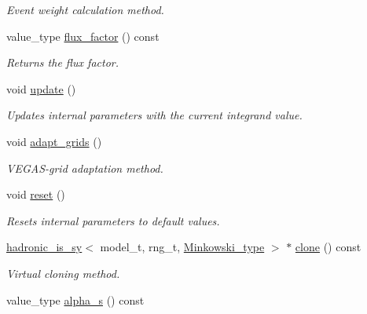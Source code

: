 \begin{DoxyCompactItemize}
\begin{DoxyCompactList}\small\item\em Event weight calculation method. \end{DoxyCompactList}\item 
\hypertarget{a00259_adc018439680f98e95fd4330c8d384fc6}{}value\+\_\+type \hyperlink{a00259_adc018439680f98e95fd4330c8d384fc6}{flux\+\_\+factor} () const \label{a00259_adc018439680f98e95fd4330c8d384fc6}

\begin{DoxyCompactList}\small\item\em Returns the flux factor. \end{DoxyCompactList}\item 
\hypertarget{a00259_a6436d3581b268b19b9c4ae576fb2b8f6}{}void \hyperlink{a00259_a6436d3581b268b19b9c4ae576fb2b8f6}{update} ()\label{a00259_a6436d3581b268b19b9c4ae576fb2b8f6}

\begin{DoxyCompactList}\small\item\em Updates internal parameters with the current integrand value. \end{DoxyCompactList}\item 
\hypertarget{a00259_a758d1e8e7b40f03cc075521722616539}{}void \hyperlink{a00259_a758d1e8e7b40f03cc075521722616539}{adapt\+\_\+grids} ()\label{a00259_a758d1e8e7b40f03cc075521722616539}

\begin{DoxyCompactList}\small\item\em V\+E\+G\+A\+S-\/grid adaptation method. \end{DoxyCompactList}\item 
\hypertarget{a00259_a413a2200c7a02cdf6468b705b624a2e1}{}void \hyperlink{a00259_a413a2200c7a02cdf6468b705b624a2e1}{reset} ()\label{a00259_a413a2200c7a02cdf6468b705b624a2e1}

\begin{DoxyCompactList}\small\item\em Resets internal parameters to default values. \end{DoxyCompactList}\item 
\hypertarget{a00259_a8dcae9b69d0c265f56914cd59f18c63e}{}\hyperlink{a00258}{hadronic\+\_\+is\+\_\+sy}$<$ model\+\_\+t, rng\+\_\+t, \hyperlink{a00371}{Minkowski\+\_\+type} $>$ $\ast$ \hyperlink{a00259_a8dcae9b69d0c265f56914cd59f18c63e}{clone} () const \label{a00259_a8dcae9b69d0c265f56914cd59f18c63e}

\begin{DoxyCompactList}\small\item\em Virtual cloning method. \end{DoxyCompactList}\item 
\hypertarget{a00259_aa3b7deda67549e6eb64d6a975a57247e}{}value\+\_\+type \hyperlink{a00259_aa3b7deda67549e6eb64d6a975a57247e}{alpha\+\_\+s} () const \label{a00259_aa3b7deda67549e6eb64d6a975a57247e}


\end{DoxyCompactItemize}
